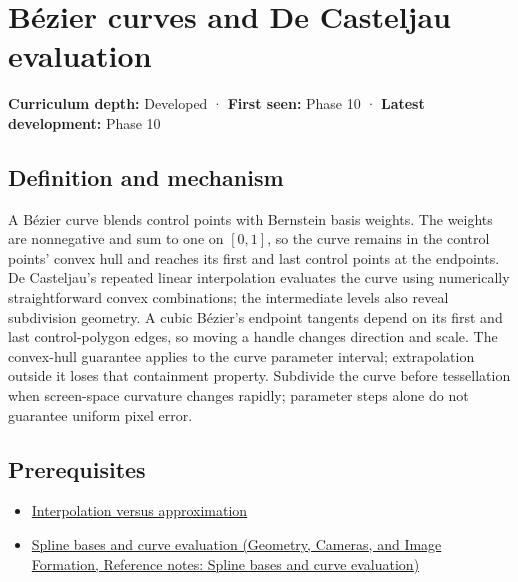 \hypertarget{appendix-ddbec701898c}{}\label{referencestart:appendix-ddbec701898c}
\section{Bézier curves and De Casteljau evaluation}\label{appendix-ddbec701898c-buxe9zier-curves-and-de-casteljau-evaluation}

\textbf{Curriculum depth:} Developed · \textbf{First seen:} Phase 10 · \textbf{Latest development:} Phase 10

\begin{allmightroledefinition}

\subsection{Definition and mechanism}\label{appendix-ddbec701898c-definition-and-mechanism}

A Bézier curve blends control points with Bernstein basis weights. The weights are nonnegative and sum to one on \([0,1]\), so the curve remains in the control points' convex hull and reaches its first and last control points at the endpoints. De Casteljau's repeated linear interpolation evaluates the curve using numerically straightforward convex combinations; the intermediate levels also reveal subdivision geometry. A cubic Bézier's endpoint tangents depend on its first and last control-polygon edges, so moving a handle changes direction and scale. The convex-hull guarantee applies to the curve parameter interval; extrapolation outside it loses that containment property. Subdivide the curve before tessellation when screen-space curvature changes rapidly; parameter steps alone do not guarantee uniform pixel error.

\end{allmightroledefinition}

\subsection{Prerequisites}\label{appendix-ddbec701898c-prerequisites}

\begin{itemize}
\tightlist
\item
  \hyperref[appendix-0c2a5f69851e]{Interpolation versus approximation}
\item
  \href{../03-Geometry-Cameras-and-Image-Formation/main.pdf\#nameddest=appendix-f28eeec97a3d}{Spline bases and curve evaluation (Geometry, Cameras, and Image Formation, Reference notes: Spline bases and curve evaluation)}
\end{itemize}

